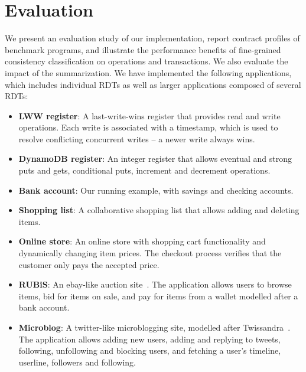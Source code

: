 \section{Evaluation}
\label{sec:results}

We present an evaluation study of our implementation, report contract
profiles of benchmark programs, and illustrate the performance benefits of
fine-grained consistency classification on operations and transactions. We
also evaluate the impact of the summarization. We have implemented the
following applications, which includes individual RDTs as well as larger
applications composed of several RDTs:

\begin{itemize}
\setlength{\itemsep}{2pt}
\item \textbf{LWW register}: A last-write-wins register that provides read
  and write operations. Each write is associated with a timestamp, which is
  used to resolve conflicting concurrent writes -- a newer write always
  wins.

\item \textbf{DynamoDB register}: An integer register that allows eventual
  and strong puts and gets, conditional puts, increment and decrement
  operations.

\item \textbf{Bank account}: Our running example, with savings and checking
  accounts.

\item \textbf{Shopping list}: A collaborative shopping list that allows
  adding and deleting items.

\item \textbf{Online store}: An online store with shopping cart
  functionality and dynamically changing item prices.  The checkout process
  verifies that the customer only pays the accepted price.

\item \textbf{RUBiS}: An ebay-like auction site~\cite{RUBiS}. The
  application allows users to browse items, bid for items on sale, and pay
  for items from a wallet modelled after a bank account.

\item \textbf{Microblog}: A twitter-like microblogging site, modelled after
  Twissandra~\cite{Twissandra}. The application allows adding new users,
  adding and replying to tweets, following, unfollowing and blocking users,
  and fetching a user's timeline, userline, followers and following.
\end{itemize}

